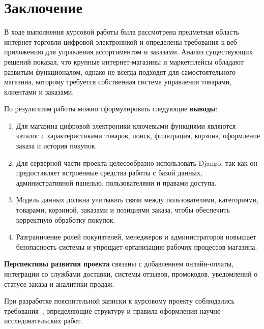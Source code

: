 \section*{Заключение}

В ходе выполнения курсовой работы была рассмотрена предметная область интернет-торговли
цифровой электроникой и определены требования к веб-приложению для управления ассортиментом
и заказами. Анализ существующих решений показал, что крупные интернет-магазины и
маркетплейсы обладают развитым функционалом, однако не всегда подходят для самостоятельного
магазина, которому требуется собственная система управления товарами, клиентами и заказами.

По результатам работы можно сформулировать следующие \textbf{выводы}:

\begin{enumerate}
    \item Для магазина цифровой электроники ключевыми функциями являются каталог с
    характеристиками товаров, поиск, фильтрация, корзина, оформление заказа и история покупок.
    \item Для серверной части проекта целесообразно использовать Django, так как он предоставляет
    встроенные средства работы с базой данных, административной панелью, пользователями и правами
    доступа.
    \item Модель данных должна учитывать связи между пользователями, категориями, товарами,
    корзиной, заказами и позициями заказа, чтобы обеспечить корректную обработку покупок.
    \item Разграничение ролей покупателей, менеджеров и администраторов повышает безопасность
    системы и упрощает организацию рабочих процессов магазина.
\end{enumerate}

\textbf{Перспективы развития проекта} связаны с добавлением онлайн-оплаты, интеграции со
службами доставки, системы отзывов, промокодов, уведомлений о статусе заказа и аналитики продаж.

При разработке пояснительной записки к курсовому проекту соблюдались требования~\cite{gost_report},
определяющие структуру и правила оформления научно-исследовательских работ.
